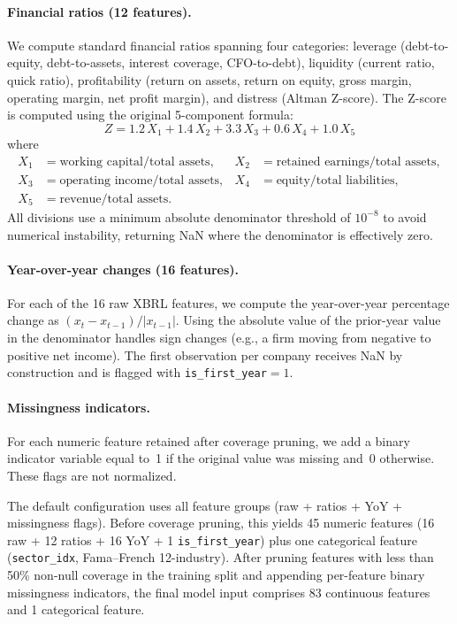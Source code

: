 \paragraph{Financial ratios (12 features).} We compute standard financial ratios spanning four categories: leverage (debt-to-equity, debt-to-assets, interest coverage, CFO-to-debt), liquidity (current ratio, quick ratio), profitability (return on assets, return on equity, gross margin, operating margin, net profit margin), and distress (Altman Z-score). The \citet{altman1968financial} Z-score is computed using the original 5-component formula:
\begin{equation}
  Z = 1.2\,X_1 + 1.4\,X_2 + 3.3\,X_3 + 0.6\,X_4 + 1.0\,X_5
  \label{eq:altman}
\end{equation}
where
\begin{align*}
  X_1 &= \text{working capital} / \text{total assets}, &
  X_2 &= \text{retained earnings} / \text{total assets}, \\
  X_3 &= \text{operating income} / \text{total assets}, &
  X_4 &= \text{equity} / \text{total liabilities}, \\
  X_5 &= \text{revenue} / \text{total assets}. &&
\end{align*}
All divisions use a minimum absolute denominator threshold of $10^{-8}$ to avoid numerical instability, returning NaN where the denominator is effectively zero.

\paragraph{Year-over-year changes (16 features).} For each of the 16 raw XBRL features, we compute the year-over-year percentage change as $(x_t - x_{t-1}) / |x_{t-1}|$. Using the absolute value of the prior-year value in the denominator handles sign changes (e.g., a firm moving from negative to positive net income). The first observation per company receives NaN by construction and is flagged with \texttt{is\_first\_year}${}= 1$.

\paragraph{Missingness indicators.} For each numeric feature retained after coverage pruning, we add a binary indicator variable equal to~1 if the original value was missing and~0 otherwise. These flags are not normalized.

The default configuration uses all feature groups (raw + ratios + YoY + missingness flags). Before coverage pruning, this yields 45 numeric features (16 raw + 12 ratios + 16 YoY + 1 \texttt{is\_first\_year}) plus one categorical feature (\texttt{sector\_idx}, Fama--French 12-industry). After pruning features with less than 50\% non-null coverage in the training split and appending per-feature binary missingness indicators, the final model input comprises 83 continuous features and 1 categorical feature.


